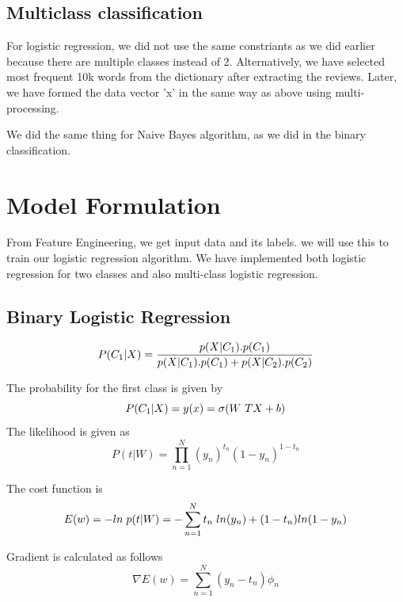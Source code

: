 \documentclass{article}
\begin{document}
\subsection{Multiclass classification}

For logistic regression, we did not use the same constriants as we did earlier because there are multiple classes instead of 2. Alternatively, we have selected most frequent 10k words from the dictionary after extracting the reviews. Later, we have formed the data vector 'x' in the same way as above using multi-processing.   

We did the same thing for Naive Bayes algorithm, as we did in the binary classification.

\section{Model Formulation}
From Feature Engineering, we get input data and its labels. we will use this to train our logistic regression algorithm. We have implemented both logistic regression for two classes and also multi-class logistic regression.
\subsection{Binary Logistic Regression}
\begin{equation}
P(C_{1}|X) = \vspace{10mm}   \frac{p(X|C_{1}).p(C_{1})}{p(X|C_{1}).p(C_{1}) + p(X|C_{2}).p(C_{2})}
\end{equation}

The probability for the first class is given by 
\begin{equation}
P(C_{1}|X) = y(x)  = \sigma(W\textsuperscript{T}X + b) 
\end{equation}
The likelihood is given as 
\begin{equation}
P(t|W) = \prod\limits_{n=1}^N (y_{n})^{t_{n}}(1-y_{n})^{1- t_{n}}
\end{equation}

The cost function is 
\begin{equation}
E(w) = -ln \hspace{1mm} p(t|W) = -\sum\limits_{n=1}^N t_{n}\hspace{1mm}ln(y_{n}) + (1-t_{n})ln(1-y_{n})
\end{equation}

Gradient is calculated as follows
\begin{equation}
\nabla E(w) = \sum\limits_{n=1}^N (y_{n} - t_{n}) \phi_{n}
\end{equation}
\end{document}
